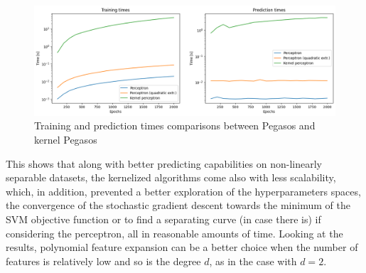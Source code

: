 \documentclass{article}
\begin{document}
\begin{figure}
	\centering
	\includegraphics[width=\columnwidth]{../plots/time_svm.png}
	\caption{Training and prediction times comparisons between Pegasos and kernel Pegasos}
	\label{fig:time_svm}
\end{figure}
This shows that along with better predicting capabilities on non-linearly separable datasets, the kernelized algorithms come also with less scalability, which, in addition, prevented a better exploration of the hyperparameters spaces, the convergence of the stochastic gradient descent towards the minimum of the SVM objective function or to find a separating curve (in case there is) if considering the perceptron, all in reasonable amounts of time. Looking at the results, polynomial feature expansion can be a better choice when the number of features is relatively low and so is the degree $d$, as in the case with $d=2$.
\end{document}
